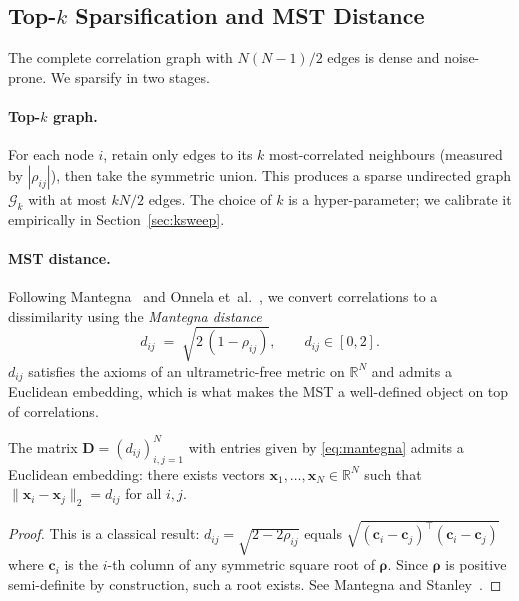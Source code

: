 \subsection{Top-$k$ Sparsification and MST Distance}
\label{sec:mst}

The complete correlation graph with $N(N-1)/2$ edges is dense and
noise-prone.  We sparsify in two stages.

\paragraph{Top-$k$ graph.}
For each node $i$, retain only edges to its $k$ most-correlated
neighbours (measured by $|\rho_{ij}|$), then take the symmetric union.
This produces a sparse undirected graph $\mathcal{G}_k$ with at most
$kN/2$ edges.  The choice of $k$ is a hyper-parameter; we calibrate
it empirically in Section~\ref{sec:ksweep}.

\paragraph{MST distance.}
Following Mantegna~\cite{mantegna1999hierarchical} and Onnela
et~al.~\cite{onnela2003dynamics}, we convert correlations to a
dissimilarity using the \emph{Mantegna distance}
\begin{equation}
  d_{ij} \;=\; \sqrt{2\,(1-\rho_{ij})},
  \qquad
  d_{ij}\in[0,2].
  \label{eq:mantegna}
\end{equation}
$d_{ij}$ satisfies the axioms of an ultrametric-free metric on
$\mathbb{R}^N$ and admits a Euclidean embedding, which is what makes
the MST a well-defined object on top of correlations.

\begin{proposition}
The matrix $\bm{D}=(d_{ij})_{i,j=1}^N$ with entries given by
\eqref{eq:mantegna} admits a Euclidean embedding: there exists vectors
$\bm{x}_1,\dots,\bm{x}_N\in\mathbb{R}^N$ such that
$\lVert\bm{x}_i-\bm{x}_j\rVert_2 = d_{ij}$ for all $i,j$.
\end{proposition}
\begin{proof}
This is a classical result: $d_{ij}=\sqrt{2-2\rho_{ij}}$ equals
$\sqrt{(\bm{c}_i-\bm{c}_j)^{\!\top}(\bm{c}_i-\bm{c}_j)}$ where $\bm{c}_i$
is the $i$-th column of any symmetric square root of $\bm{\rho}$.
Since $\bm{\rho}$ is positive semi-definite by construction, such a
root exists.  See Mantegna and
Stanley~\cite[Ch.~3]{mantegna1999introduction}.
\end{proof}

